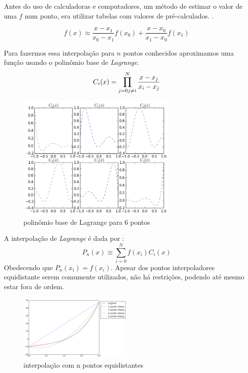  Antes do uso de calculadoras e computadores, um método de estimar o valor de uma $f$ num ponto, era utilizar tabelas com valores de pré-calculados. .

\begin{equation}
	f(x) \approx \frac{x - x_1}{x_0 - x_1}f(x_0)  + 							 \frac{x - x_0}{x_1 - x_0}f(x_1)
\end{equation} 
 
 Para fazermos essa interpolação para $n$ pontos conhecidos aproximamos uma função usando o polinômio base de \emph{Lagrange}.
\begin{equation}
C_i(x) = \prod_{j = 0 \\ j \neq i}^{N} \frac{x - x_j}{x_i - x_j} 
\end{equation}

\begin{figure}[!h]
\includegraphics[width=0.7\textwidth, center ]{figuras/exemplo_polinomio_lagrange.png}
\caption{polinômio base de Lagrange para 6 pontos}
\end{figure}

 A interpolação de \emph{Lagrange} é dada por :
\begin{equation}
 P_n(x) \equiv \sum_{i = 0}^{N} f(x_i)C_i(x) 
\end{equation}
 Obedecendo que $P_n(x_i) = f(x_i)$. Apesar dos pontos interpoladores equidistante serem comumente utilizados, não há restrições, podendo até mesmo estar fora de ordem.
\begin{figure}[h]
  \includegraphics[width=0.5\textwidth, center]{figuras/interpolacao_linear5.png}
  \caption{interpolação com n pontos equidistantes}
\end{figure}

